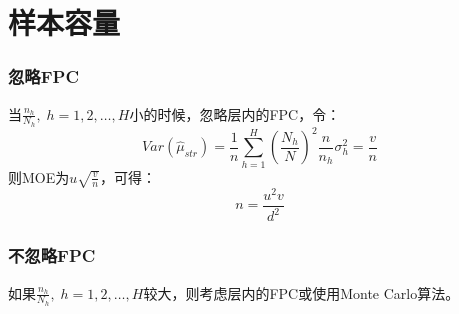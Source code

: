 \section{样本容量}
\subsubsection{忽略FPC}
当$\frac{n_h}{N_h},\;h=1,2,\dots,H$小的时候，忽略层内的FPC，令：
\begin{equation*}
	Var(\hat{\mu}_{str})=\frac{1}{n}\sum_{h=1}^H\left(\frac{N_h}{N}\right)^2\frac{n}{n_h}\sigma_h^2=\frac{v}{n}
\end{equation*}
则MOE为$u\sqrt{\frac{v}{n}}$，可得：
\begin{equation*}
	n=\frac{u^2v}{d^2}
\end{equation*}
\subsubsection{不忽略FPC}
如果$\frac{n_h}{N_h},\;h=1,2,\dots,H$较大，则考虑层内的FPC或使用Monte Carlo算法。